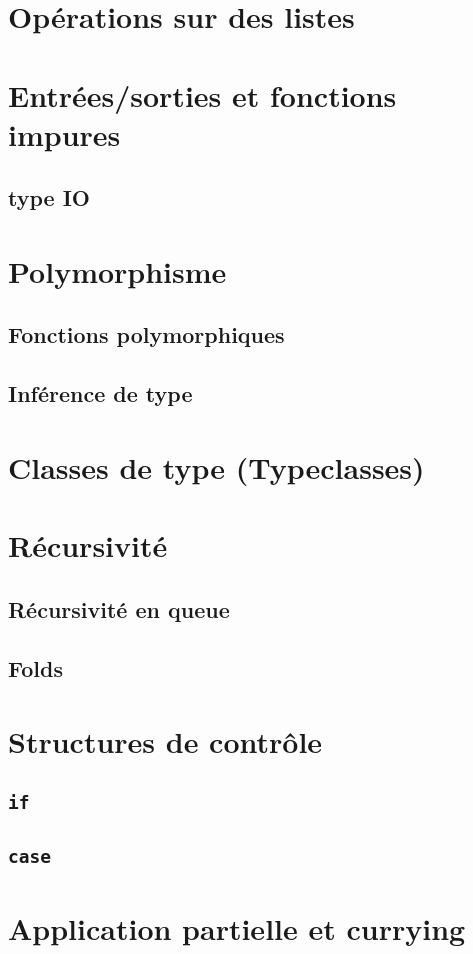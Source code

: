 \documentclass[a5paper,french]{article}
\newcommand{\concept}[2][]{#2}
\newcommand\hs[1]{\texttt{#1}}
\begin{document}
\section{ Opérations sur des listes}
\section{ Entrées/sorties et fonctions impures}
\subsection{ type IO}
\section{ Polymorphisme}
\subsection{ Fonctions polymorphiques}
\subsection{ Inférence de type}
\section{ Classes de type (\concept{Typeclasses})}
\section{ Récursivité}
\subsection{ Récursivité en queue}
\subsection{ Folds}
\section{ Structures de contrôle}
\subsection{ \hs{if}}
\subsection{ \hs{case}}
\section{ Application partielle et currying}
\end{document}

